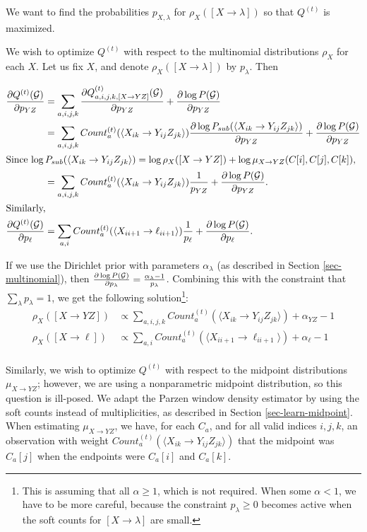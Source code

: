\documentclass{article}
\begin{document}
We want to find the probabilities $p_{X,\lambda}$ for $\rho_X([X\to
\lambda])$ so that $Q^{(t)}$ is maximized.

We wish to optimize $Q^{(t)}$ with respect to the multinomial
distributions $\rho_X$ for each $X$. Let us fix $X$, and denote
$\rho_X([X\to \lambda])$ by $p_\lambda$. Then

\begin{align*}
\frac{\partial Q^{(t)}({\mathcal G})}{\partial p_{YZ}} &=
\sum_{a,i,j,k} \frac{\partial Q^{(t)}_{a,i,j,k,[X\to
    YZ]}({\mathcal G})}{\partial p_{YZ}} + \frac{\partial \log P({\mathcal G})}{\partial p_{YZ}} \\
&= 
\sum_{a,i,j,k} Count^{(t)}_a(\langle X_{ik} \to Y_{ij} Z_{jk} \rangle)
\frac{\partial \log P_{sub}(\langle X_{ik} \to
  Y_{ij}Z_{jk}\rangle)}{\partial p_{YZ}} + \frac{\partial
  \log P({\mathcal G})}{\partial p_{YZ}} \\
\intertext{Since $ \log P_{sub}(\langle X_{ik} \to
  Y_{ij}Z_{jk}\rangle) = \log \rho_X([X\to YZ]) + \log \mu_{X\to
    YZ}(C[i],C[j],C[k]),$ }
&= 
\sum_{a,i,j,k} Count^{(t)}_a(\langle X_{ik} \to Y_{ij} Z_{jk} \rangle)
\frac{1}{p_{YZ}} + \frac{\partial
  \log P({\mathcal G})}{\partial p_{YZ}}. \\
\intertext{Similarly,}
\frac{\partial Q^{(t)}({\mathcal G})}{\partial p_{\ell}} &=
\sum_{a,i} Count^{(t)}_a(\langle X_{i i+1} \to \ell_{i i+1} \rangle)
\frac{1}{p_{\ell}} + \frac{\partial
  \log P({\mathcal G})}{\partial p_{\ell}}. \\
\end{align*}

If we use the Dirichlet prior with parameters $\alpha_\lambda$ (as described in Section
\ref{sec-multinomial}), then $\frac{\partial \log P({\mathcal G})}{\partial
  p_{\lambda}} = \frac{\alpha_\lambda - 1}{p_\lambda}$. Combining this
with the constraint that $\sum_\lambda {p_\lambda}=1$, we get the
following solution\footnote{This is assuming that all $\alpha\ge 1$,
  which is not required. When some $\alpha < 1$, we have to be more
  careful, because the constraint $p_\lambda \ge 0$ becomes active
  when the soft counts for $[X\to \lambda]$ are small.}:
\begin{align*}
  \rho_{X}([X\to YZ]) &\propto \sum_{a,i,j,k} Count^{(t)}_a(\langle
  X_{ik} \to Y_{ij} Z_{jk} \rangle) + \alpha_{YZ} - 1\\
  \rho_{X}([X\to \ell]) &\propto \sum_{a,i} Count^{(t)}_a(\langle
  X_{i i+1} \to \ell_{i i+1} \rangle) + \alpha_{\ell} - 1\\
\end{align*}

Similarly, we wish to optimize $Q^{(t)}$ with respect to the midpoint
distributions $\mu_{X\to YZ}$; however, we are using a nonparametric
midpoint distribution, so this question is ill-posed. We adapt the
Parzen window density estimator by using the soft counts instead of
multiplicities, as described in Section \ref{sec-learn-midpoint}. When
estimating $\mu_{X\to YZ}$, we have, for each $C_a$, and for all valid
indices $i,j,k$, an observation with weight $Count_a^{(t)}(\langle
X_{ik} \to Y_{ij} Z_{jk}\rangle)$ that the midpoint was $C_a[j]$ when
the endpoints were $C_a[i]$ and $C_a[k]$.
\end{document}
